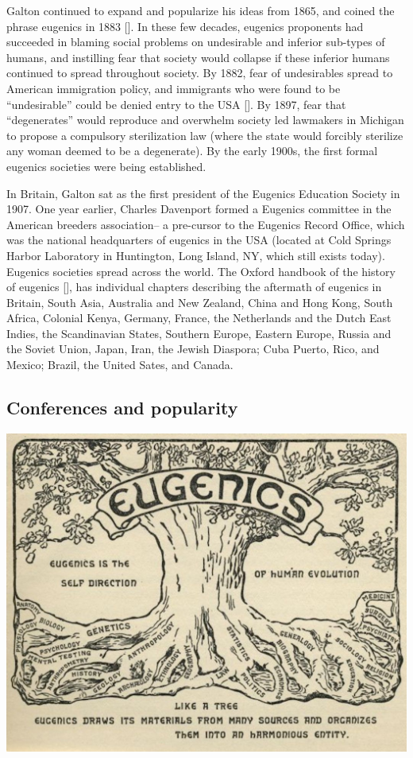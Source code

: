 \documentclass[
  oneside,
  12pt]{crumpbook}
\newenvironment{floatright50}{%
  \wrapfigure{R}{.5\textwidth}%
  }{%
  \endwrapfigure}
\begin{document}
Galton continued to expand and popularize his ideas from 1865, and coined the phrase eugenics in 1883 {[}{]}. In these few decades, eugenics proponents had succeeded in blaming social problems on undesirable and inferior sub-types of humans, and instilling fear that society would collapse if these inferior humans continued to spread throughout society. By 1882, fear of undesirables spread to American immigration policy, and immigrants who were found to be ``undesirable'' could be denied entry to the USA {[}{]}. By 1897, fear that ``degenerates'' would reproduce and overwhelm society led lawmakers in Michigan to propose a compulsory sterilization law (where the state would forcibly sterilize any woman deemed to be a degenerate). By the early 1900s, the first formal eugenics societies were being established.

In Britain, Galton sat as the first president of the Eugenics Education Society in 1907. One year earlier, Charles Davenport formed a Eugenics committee in the American breeders association-- a pre-cursor to the Eugenics Record Office, which was the national headquarters of eugenics in the USA (located at Cold Springs Harbor Laboratory in Huntington, Long Island, NY, which still exists today). Eugenics societies spread across the world. The Oxford handbook of the history of eugenics {[}{]}, has individual chapters describing the aftermath of eugenics in Britain, South Asia, Australia and New Zealand, China and Hong Kong, South Africa, Colonial Kenya, Germany, France, the Netherlands and the Dutch East Indies, the Scandinavian States, Southern Europe, Eastern Europe, Russia and the Soviet Union, Japan, Iran, the Jewish Diaspora; Cuba Puerto, Rico, and Mexico; Brazil, the United Sates, and Canada.

\hypertarget{conferences-and-popularity}{%
\subsection{Conferences and popularity}\label{conferences-and-popularity}}

\begin{floatright50}
\includegraphics[width=1\linewidth]{imgs/Eugenics_tree}

\end{floatright50}
\end{document}
